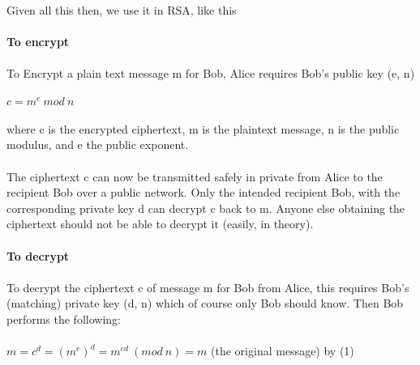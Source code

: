 \documentclass[11pt]{article}   	%
\begin{document}
\\
Given all this then, we use it in RSA, like this \\
\\
\textbf{To encrypt} \\
\\
To Encrypt a plain text message m for Bob, Alice requires Bob's public key (e, n) \\
\\
$ c = m^e \ mod \ n $ \\
\\
where c is the encrypted ciphertext, m is the plaintext message, n is the public modulus, and e the public exponent. \\
\\
The ciphertext c can now be transmitted safely in private from Alice to the recipient Bob over a public network. Only the intended recipient Bob, with the corresponding private key d can decrypt c back to m. Anyone else obtaining the ciphertext should not be able to decrypt it (easily, in theory). \\
\\
\textbf{To decrypt} \\
\\
To decrypt the ciphertext c of message m for Bob from Alice, this requires Bob's (matching) private key (d, n) which of course only Bob should know. Then Bob performs the following: \\
\\
$ m = c^d = (m^e)^d = m^{ed} \ (mod \ n) = m$ (the original message) by (1) \\

\break 
\end{document}
